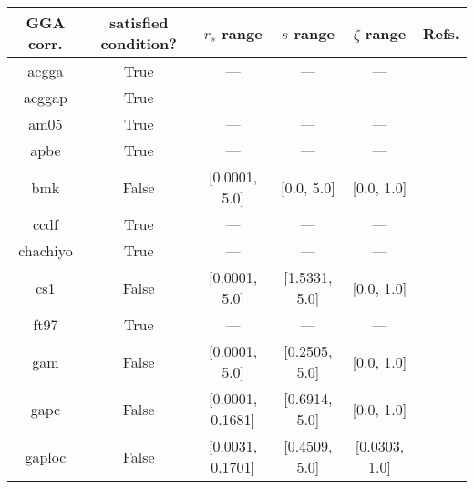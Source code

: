 \begin{tabular}{|c|c|c|c|c|l|}
\hline
     GGA corr. &  satisfied condition? &      $r_s$ range &        $s$ range & $\zeta$ range  &                                                          Refs. \\ \hline
         acgga &                  True &              --- &              --- &            --- &                        \cite{Cancio2018_084116,Burke2014_4834} \\ \hline
        acggap &                  True &              --- &              --- &            --- &                        \cite{Cancio2018_084116,Burke2014_4834} \\ \hline
          am05 &                  True &              --- &              --- &            --- &                 \cite{Armiento2005_085108,Mattsson2008_084714} \\ \hline
          apbe &                  True &              --- &              --- &            --- &                                   \cite{Constantin2011_186406} \\ \hline
           bmk &                 False &    [0.0001, 5.0] &       [0.0, 5.0] &     [0.0, 1.0] &                                          \cite{Boese2004_3405} \\ \hline
          ccdf &                  True &              --- &              --- &            --- &                                      \cite{Margraf2019_244116} \\ \hline
      chachiyo &                  True &              --- &              --- &            --- &                                     \cite{Chachiyo2020_112669} \\ \hline
           cs1 &                 False &    [0.0001, 5.0] &    [1.5331, 5.0] &     [0.0, 1.0] &                          \cite{Handy2002_5411,Proynov2006_436} \\ \hline
          ft97 &                  True &              --- &              --- &            --- &                         \cite{Filatov1997_603,Filatov1997_847} \\ \hline
           gam &                 False &    [0.0001, 5.0] &    [0.2505, 5.0] &     [0.0, 1.0] &                                            \cite{Yu2015_12146} \\ \hline
          gapc &                 False & [0.0001, 0.1681] &    [0.6914, 5.0] &     [0.0, 1.0] &                                        \cite{Fabiano2014_2016} \\ \hline
        gaploc &                 False & [0.0031, 0.1701] &    [0.4509, 5.0] &  [0.0303, 1.0] &                                        \cite{Fabiano2014_2016} \\ \hline

\end{tabular}
